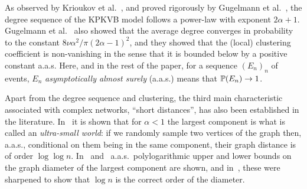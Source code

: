 As observed by Krioukov et al.~\cite{krioukov2010hyperbolic}, and proved rigorously by Gugelmann et al.~\cite{gugelmann2012random}, the degree sequence of the KPKVB model follows a power-law with exponent $2\alpha+1$.
% 
% 
%
%
Gugelmann et al.~\cite{gugelmann2012random} also showed that the average degree converges in probability to the constant $8\nu\alpha^2/ \pi (2\alpha-1)^2$, and they showed that the (local) clustering coefficient is non-vanishing in the sense that it is bounded below by a positive constant a.a.s. Here, and in the rest of the paper, for a sequence $(E_n)_n$ of events, $E_n$ {\em asymptotically almost surely} (a.a.s.) means that $\mathbb{P}(E_n)\to 1$.

Apart from the degree sequence and clustering, the third main characteristic associated with complex networks, ``short distances'', has also been established in the literature. In~\cite{abdullah2017typical} it is shown that for $\alpha < 1$ the largest component is what is called an \emph{ultra-small world}: if we randomly sample two vertices of the graph then, a.a.s., conditional on them being in the same component, their graph distance is of order $\log\log n$. In~\cite{KiwiMit} and~\cite{ar:FriedKrohmerDiam} a.a.s.~polylogarithmic upper and lower bounds on the graph diameter of the largest component 
are shown, and in~\cite{ar:MullerDiam}, these were sharpened to show that $\log n$ is the correct order of the diameter.

